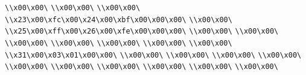 \verb|\\x00\x00\|\newline
\verb|\\x00\x00\|\newline
\verb|\\x00\x00\|\newline
\verb|\\x23\x00\xfc\x00\x24\x00\xbf\x00\x00\x00\|\newline
\verb|\\x00\x00\|\newline
\verb|\\x25\x00\xff\x00\x26\x00\xfe\x00\x00\x00\|\newline
\verb|\\x00\x00\|\newline
\verb|\\x00\x00\|\newline
\verb|\\x00\x00\|\newline
\verb|\\x00\x00\|\newline
\verb|\\x00\x00\|\newline
\verb|\\x00\x00\|\newline
\verb|\\x00\x00\|\newline
\verb|\\x31\x00\x03\x01\x00\x00\|\newline
\verb|\\x00\x00\|\newline
\verb|\\x00\x00\|\newline
\verb|\\x00\x00\|\newline
\verb|\\x00\x00\|\newline
\verb|\\x00\x00\|\newline
\verb|\\x00\x00\|\newline
\verb|\\x00\x00\|\newline
\verb|\\x00\x00\|\newline
\verb|\\x00\x00\|\newline
\verb|\\x00\x00\|\newline
